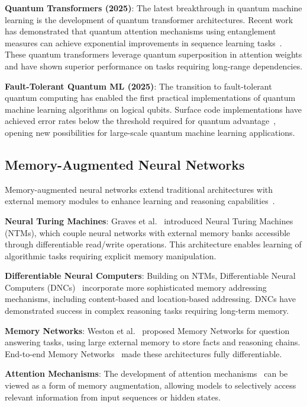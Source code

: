 \textbf{Quantum Transformers (2025)}: The latest breakthrough in quantum machine learning is the development of quantum transformer architectures. Recent work has demonstrated that quantum attention mechanisms using entanglement measures can achieve exponential improvements in sequence learning tasks~\cite{quantum_transformers_2025}. These quantum transformers leverage quantum superposition in attention weights and have shown superior performance on tasks requiring long-range dependencies.

\textbf{Fault-Tolerant Quantum ML (2025)}: The transition to fault-tolerant quantum computing has enabled the first practical implementations of quantum machine learning algorithms on logical qubits. Surface code implementations have achieved error rates below the threshold required for quantum advantage~\cite{surface_code_ml_2025}, opening new possibilities for large-scale quantum machine learning applications.

\subsection{Memory-Augmented Neural Networks}

Memory-augmented neural networks extend traditional architectures with external memory modules to enhance learning and reasoning capabilities~\cite{graves2016hybrid}.

\textbf{Neural Turing Machines}: Graves et al.~\cite{graves2014neural} introduced Neural Turing Machines (NTMs), which couple neural networks with external memory banks accessible through differentiable read/write operations. This architecture enables learning of algorithmic tasks requiring explicit memory manipulation.

\textbf{Differentiable Neural Computers}: Building on NTMs, Differentiable Neural Computers (DNCs)~\cite{graves2016hybrid} incorporate more sophisticated memory addressing mechanisms, including content-based and location-based addressing. DNCs have demonstrated success in complex reasoning tasks requiring long-term memory.

\textbf{Memory Networks}: Weston et al.~\cite{weston2014memory} proposed Memory Networks for question answering tasks, using large external memory to store facts and reasoning chains. End-to-end Memory Networks~\cite{sukhbaatar2015end} made these architectures fully differentiable.

\textbf{Attention Mechanisms}: The development of attention mechanisms~\cite{bahdanau2014neural, vaswani2017attention} can be viewed as a form of memory augmentation, allowing models to selectively access relevant information from input sequences or hidden states.

